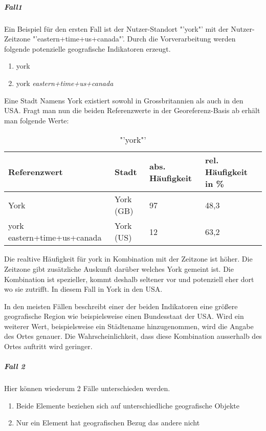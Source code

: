 					\subparagraph{Fall1} 

						Ein Beispiel für den ersten Fall ist der Nutzer-Standort "'york"' mit der Nutzer-Zeitzone "'eastern+time+us+canada"'. 
						Durch die Vorverarbeitung werden folgende potenzielle geografische Indikatoren erzeugt.
						\begin{enumerate}		
							\item york
							\item york \textit{eastern+time+us+canada}
						\end{enumerate}		

						Eine Stadt Namens York existiert sowohl in Grossbritannien als auch in den USA.
						Fragt man nun die beiden Referenzwerte in der Georeferenz-Basis ab erhält man folgende Werte:

							\begin{table}[h]
								\centering
									\caption{"'york"'}
									\label{tab:york}
									\begin{tabular}{|l|l|l|l|}
									\hline
									Referenzwert 				& Stadt  	& abs. Häufigkeit & rel. Häufigkeit in \% \\ \hline \hline
									York          				& York (GB) & 97              & 48,3       \\ \hline
									york eastern+time+us+canada & York (US) & 12              & 63,2        \\ \hline
									\end{tabular}
							\end{table}

							Die realtive Häufigkeit für york in Kombination mit der Zeitzone ist höher. 
							Die Zeitzone gibt zusätzliche Auskunft darüber welches York gemeint ist. 
							Die Kombination ist spezieller, kommt deshalb seltener vor und potenziell eher dort wo sie zutrifft. 
							In diesem Fall in York in den USA. 

							In den meisten Fällen beschreibt einer der beiden Indikatoren eine größere geografische Region wie beispielsweise einen Bundesstaat der USA.
							Wird ein weiterer Wert, beispielsweise ein Städtename hinzugenommen, wird die Angabe des Ortes genauer. 
							Die Wahrscheinlichkeit, dass diese Kombination ausserhalb des Ortes auftritt wird geringer. 

					\subparagraph{Fall 2}

						Hier können wiederum 2 Fälle unterschieden werden.

						\begin{enumerate}
							\item Beide Elemente beziehen sich auf unterschiedliche geografische Objekte
							\item Nur ein Element hat geografischen Bezug das andere nicht 
						\end{enumerate}

